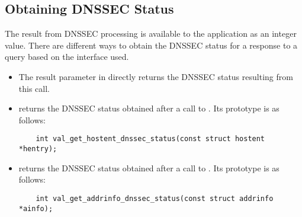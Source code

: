 \subsection{Obtaining DNSSEC Status}
\label{getstatus}
                                                                                                                             
The result from DNSSEC processing is available to the application
as an integer value. There are different ways to obtain the DNSSEC status 
for a response to a query based on the interface used. 
                                                                                                                             
\begin{itemize}
                                                                                                                             
\item The  result parameter in  directly returns
      the DNSSEC status resulting from this call.
                                                                                                                             
\item {} returns the DNSSEC status obtained
      after a call to . Its prototype is as follows:

\begin{verbatim}
    int val_get_hostent_dnssec_status(const struct hostent *hentry);
\end{verbatim}

\item {} returns the DNSSEC status obtained
      after a call to . Its prototype is as follows:
                                                                                                                             
\begin{verbatim}
    int val_get_addrinfo_dnssec_status(const struct addrinfo *ainfo);
\end{verbatim}
                                                                                                                             
\end{itemize}
                                                                                                                             

